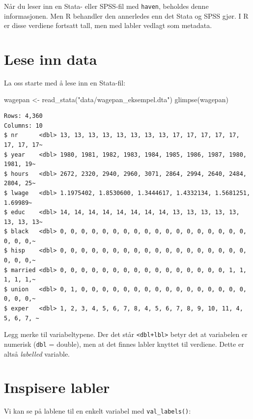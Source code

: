 \documentclass[
  norsk,
  letterpaper,
  DIV=11,
  numbers=noendperiod]{scrreprt}
\newenvironment{Shaded}{\begin{snugshade}}{\end{snugshade}}
\newcommand{\FunctionTok}[1]{\textcolor[rgb]{0.28,0.35,0.67}{#1}}
\newcommand{\NormalTok}[1]{\textcolor[rgb]{0.00,0.23,0.31}{#1}}
\newcommand{\OtherTok}[1]{\textcolor[rgb]{0.00,0.23,0.31}{#1}}
\newcommand{\StringTok}[1]{\textcolor[rgb]{0.13,0.47,0.30}{#1}}
\theoremstyle{definition}
\theoremstyle{remark}
\begin{document}
Når du leser inn en Stata- eller SPSS-fil med \texttt{haven}, beholdes
denne informasjonen. Men R behandler den annerledes enn det Stata og
SPSS gjør. I R er disse verdiene fortsatt tall, men med labler vedlagt
som metadata.

\section{Lese inn data}\label{lese-inn-data-1}

La oss starte med å lese inn en Stata-fil:

\begin{Shaded}
\begin{Highlighting}[]
\NormalTok{wagepan }\OtherTok{\textless{}{-}} \FunctionTok{read\_stata}\NormalTok{(}\StringTok{"data/wagepan\_eksempel.dta"}\NormalTok{)}
\FunctionTok{glimpse}\NormalTok{(wagepan)}
\end{Highlighting}
\end{Shaded}

\begin{verbatim}
Rows: 4,360
Columns: 10
$ nr      <dbl> 13, 13, 13, 13, 13, 13, 13, 13, 17, 17, 17, 17, 17, 17, 17, 17~
$ year    <dbl> 1980, 1981, 1982, 1983, 1984, 1985, 1986, 1987, 1980, 1981, 19~
$ hours   <dbl> 2672, 2320, 2940, 2960, 3071, 2864, 2994, 2640, 2484, 2804, 25~
$ lwage   <dbl> 1.1975402, 1.8530600, 1.3444617, 1.4332134, 1.5681251, 1.69989~
$ educ    <dbl> 14, 14, 14, 14, 14, 14, 14, 14, 13, 13, 13, 13, 13, 13, 13, 13~
$ black   <dbl> 0, 0, 0, 0, 0, 0, 0, 0, 0, 0, 0, 0, 0, 0, 0, 0, 0, 0, 0, 0, 0,~
$ hisp    <dbl> 0, 0, 0, 0, 0, 0, 0, 0, 0, 0, 0, 0, 0, 0, 0, 0, 0, 0, 0, 0, 0,~
$ married <dbl> 0, 0, 0, 0, 0, 0, 0, 0, 0, 0, 0, 0, 0, 0, 0, 0, 1, 1, 1, 1, 1,~
$ union   <dbl> 0, 1, 0, 0, 0, 0, 0, 0, 0, 0, 0, 0, 0, 0, 0, 0, 0, 0, 0, 0, 0,~
$ exper   <dbl> 1, 2, 3, 4, 5, 6, 7, 8, 4, 5, 6, 7, 8, 9, 10, 11, 4, 5, 6, 7, ~
\end{verbatim}

Legg merke til variabeltypene. Der det står
\texttt{\textless{}dbl+lbl\textgreater{}} betyr det at variabelen er
numerisk (\texttt{dbl} = double), men at det finnes labler knyttet til
verdiene. Dette er altså \emph{labelled} variable.

\section{Inspisere labler}\label{inspisere-labler}

Vi kan se på lablene til en enkelt variabel med \texttt{val\_labels()}:
\end{document}
